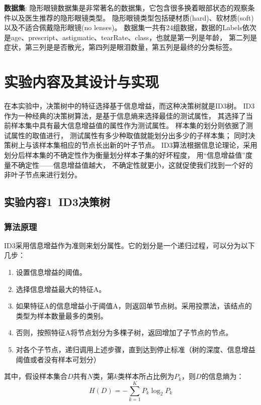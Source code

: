 \documentclass[lang=cn,a4paper]{shu-lab-report}
\begin{document}
\textbf{数据集}: 隐形眼镜数据集是非常著名的数据集，它包含很多换着眼部状态的观察条件以及医生推荐的隐形眼镜类型。
隐形眼镜类型包括硬材质(hard)、软材质(soft)以及不适合佩戴隐形眼镜(no lenses)。
数据集一共有24组数据，数据的Labels依次是age、prescript、astigmatic、tearRate、class，也就是第一列是年龄，
第二列是症状，第三列是是否散光，第四列是眼泪数量，第五列是最终的分类标签。


\section{实验内容及其设计与实现}
在本实验中，决策树中的特征选择基于信息增益，而这种决策树就是ID3树。
ID3作为一种经典的决策树算法，是基于信息熵来选择最佳的测试属性，
其选择了当前样本集中具有最大信息增益值的属性作为测试属性。
样本集的划分则依据了测试属性的取值进行，
测试属性有多少种取值就能划分出多少的子样本集；
同时决策树上与该样本集相应的节点长出新的叶子节点。
ID3算法根据信息论理论，采用划分后样本集的不确定性作为衡量划分样本子集的好坏程度，
用“信息增益值”度量不确定性——信息增益值越大，
不确定性就更小，这就促使我们找到一个好的非叶子节点来进行划分。

\subsection{实验内容1~ID3决策树}
\subsubsection{算法原理}
ID3采用信息增益作为准则来划分属性。它的划分是一个递归过程，可以分为以下几步：
\begin{enumerate}
    \item 设置信息增益的阈值。
    \item 选择信息增益最大的特征A。
    \item 如果特征A的信息增益小于阈值A，则返回单节点树。采用投票法，该结点的类型为样本数量最多的类别。
    \item 否则，按照特征A将节点划分为多棵子树，返回增加了子节点的节点。
    \item 对各个子节点，递归调用上述步骤，直到达到停止标准（树的深度、信息增益阈值或者没有样本可划分）
\end{enumerate}

其中，假设样本集合$D$共有$N$类，第$k$类样本所占比例为$P_k$，则$D$的信息熵为：
\begin{equation}
\label{eq:entropy}
H(D) = -\sum_{k=1}^K P_k \log_2 P_k
\end{equation}
\end{document}
